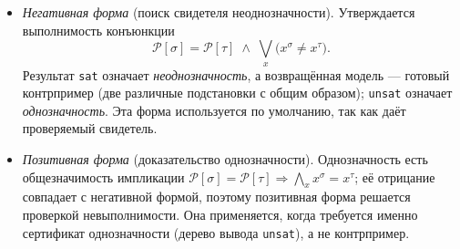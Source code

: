 \documentclass[14pt, russian]{scrartcl}
\begin{document}
\begin{itemize}
\item \textit{Негативная форма} (поиск свидетеля неоднозначности). Утверждается
  выполнимость конъюнкции
  \[
    \mathcal{P}[\sigma] = \mathcal{P}[\tau] \;\wedge\;
    \textstyle\bigvee_{x} \bigl(x^{\sigma} \neq x^{\tau}\bigr).
  \]
  Результат \texttt{sat} означает \textit{неоднозначность}, а возвращённая модель ---
  готовый контрпример (две различные подстановки с общим образом); \texttt{unsat}
  означает \textit{однозначность}. Эта форма используется по умолчанию, так как даёт
  проверяемый свидетель.
\item \textit{Позитивная форма} (доказательство однозначности). Однозначность есть
  общезначимость импликации
  $\mathcal{P}[\sigma] = \mathcal{P}[\tau] \Rightarrow \bigwedge_x x^{\sigma} = x^{\tau}$;
  её отрицание совпадает с негативной формой, поэтому позитивная форма решается проверкой
  невыполнимости. Она применяется, когда требуется именно сертификат однозначности
  (дерево вывода \texttt{unsat}), а не контрпример.
\end{itemize}
\end{document}

